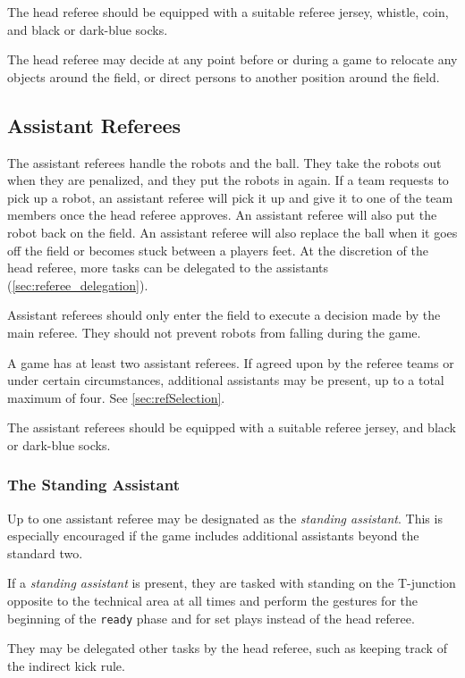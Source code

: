 The head referee should be equipped with a suitable referee jersey, whistle, coin, and black or dark-blue socks.

The head referee may decide at any point before or during a game to relocate any objects around the field, or direct persons to another position around the field.

\subsection{Assistant Referees}
\label{sec:assist_referee}

The assistant referees handle the robots and the ball.
They take the robots out when they are penalized, and they put the robots in again.
If a team requests to pick up a robot, an assistant referee will pick it up and give it to one of the team members once the head referee approves.
An assistant referee will also put the robot back on the field.
An assistant referee will also replace the ball when it goes off the field or becomes stuck between a players feet.
At the discretion of the head referee, more tasks can be delegated to the assistants (\cref{sec:referee_delegation}).

Assistant referees should only enter the field to execute a decision made by the main referee.
They should not prevent robots from falling during the game.

A game has at least two assistant referees. If agreed upon by the referee teams
or under certain circumstances, additional assistants may be present,
up to a total maximum of four. See \cref{sec:refSelection}.

The assistant referees should be equipped with a suitable referee jersey, and black or dark-blue socks.

\subsubsection{The Standing Assistant}

Up to one assistant referee may be designated as the \textit{standing assistant}.
This is especially encouraged if the game includes additional assistants
beyond the standard two.

If a \textit{standing assistant} is present, they are tasked with standing
on the T-junction opposite to the technical area at all times and perform
the gestures for the beginning of the \texttt{ready} phase and for set plays
instead of the head referee.

They may be delegated other tasks by the head referee, such as keeping track
of the indirect kick rule.

